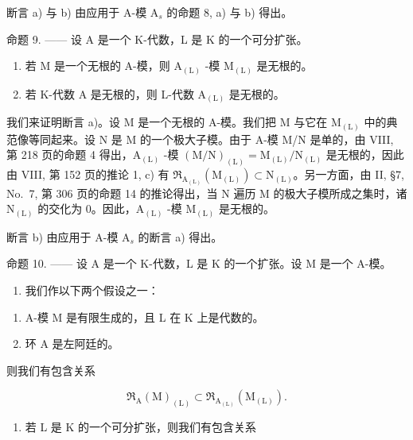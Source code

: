断言 a) 与 b) 由应用于 A-模 \(\mathrm{A}_s\) 的命题 8, a) 与 b) 得出。

命题 9. —— 设 A 是一个 K-代数，L 是 K 的一个可分扩张。

\begin{enumerate}
\def\labelenumi{\alph{enumi})}
\item
  若 M 是一个无根的 A-模，则 \(\mathrm{A}_{(\mathrm{L})}\) -模 \(\mathrm{M}_{(\mathrm{L})}\) 是无根的。
\item
  若 K-代数 A 是无根的，则 L-代数 \(\mathrm{A}_{(\mathrm{L})}\) 是无根的。
\end{enumerate}

我们来证明断言 a)。设 M 是一个无根的 A-模。我们把 M 与它在 \(\mathrm{M}_{(\mathrm{L})}\) 中的典范像等同起来。设 N 是 M 的一个极大子模。由于 A-模 M/N 是单的，由 VIII, 第 218 页的命题 4 得出，\(\mathrm{A}_{(\mathrm{L})}\) -模 \((\mathrm{M}/\mathrm{N})_{(\mathrm{L})} = \mathrm{M}_{(\mathrm{L})}/\mathrm{N}_{(\mathrm{L})}\) 是无根的，因此由 VIII, 第 152 页的推论 1, c) 有 \(\mathfrak{R}_{\mathrm{A}_{(\mathrm{L})}}(\mathrm{M}_{(\mathrm{L})}) \subset \mathrm{N}_{(\mathrm{L})}\)。另一方面，由 II, §7, No.~7, 第 306 页的命题 14 的推论得出，当 N 遍历 M 的极大子模所成之集时，诸 \(\mathrm{N}_{(\mathrm{L})}\) 的交化为 0。因此，\(\mathrm{A}_{(\mathrm{L})}\) -模 \(\mathrm{M}_{(\mathrm{L})}\) 是无根的。

断言 b) 由应用于 A-模 \(\mathrm{A}_s\) 的断言 a) 得出。

命题 10. —— 设 A 是一个 K-代数，L 是 K 的一个扩张。设 M 是一个 A-模。

\begin{enumerate}
\def\labelenumi{\alph{enumi})}
\tightlist
\item
  我们作以下两个假设之一：
\end{enumerate}

\begin{enumerate}
\def\labelenumi{(\roman{enumi})}
\item
  A-模 M 是有限生成的，且 L 在 K 上是代数的。
\item
  环 A 是左阿廷的。
\end{enumerate}

则我们有包含关系

\[
\mathfrak {R} _ {\mathrm{A}} (\mathrm{M}) _ {(\mathrm{L})} \subset \mathfrak {R} _ {\mathrm{A} _ {(\mathrm{L})}} (\mathrm{M} _ {(\mathrm{L})}).
\]

\begin{enumerate}
\def\labelenumi{\alph{enumi})}
\setcounter{enumi}{1}
\tightlist
\item
  若 L 是 K 的一个可分扩张，则我们有包含关系
\end{enumerate}

